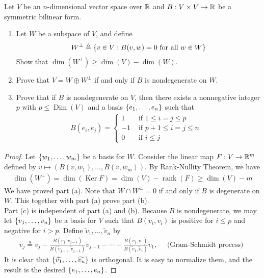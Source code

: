 \documentclass{report}
\begin{document}
\begin{question}{}{}
Let $V$ be an  $n$-dimensional vector space over $\mathbb{R}$ and  $B:V\times V\rightarrow \mathbb{R}$ be a symmetric bilinear form. 
\begin{enumerate}[label=(\alph*)]
  \item Let $W$ be a subspace of $V$, and define 
     \begin{align*}
    W^{\perp}\triangleq \left\{ v \in V: B(v,w)=0\text{ for all }w \in W \right\}
    \end{align*}
    Show that $\operatorname{dim}(W^{\perp})\geq  \operatorname{dim}(V)-\operatorname{dim}(W)$. 
    \item Prove that $V=W \oplus W^{\perp}$ if and only if $B$ is nondegenerate on $W$. 
    \item Prove that if $B$ is nondegenerate on $V$, then there exists a nonnegative integer $p$ with  $p\leq \operatorname{Dim}(V)$ and a basis $\left\{ e_1,\dots ,e_n \right\}$ such that 
      \begin{align*}
      B(e_i,e_j)= \begin{cases}
        1& \text{ if $1\leq i=j\leq p$ }\\
        -1& \text{ if $p+1\leq  i=j \leq n$ }\\
        0& \text{ if $i\leq j$ }
      \end{cases}
      \end{align*}
\end{enumerate}
\end{question}
\begin{proof}
Let $\left\{ w_1,\dots ,w_m \right\}$ be a basis for $W$. Consider the linear map $F:V\rightarrow \mathbb{R}^m$ defined by $v \mapsto  (B(v,w_1),\dots ,B(v,w_m))$. By Rank-Nullity Theorem, we have 
\begin{align*}
\operatorname{dim}(W^{\perp})=\operatorname{dim}(\operatorname{Ker}F)= \operatorname{dim}(V)- \operatorname{rank}(F) \geq  \operatorname{dim}(V)- m
\end{align*}
We have proved part (a). Note that $W\cap W^{\perp}=0$ if and only if $B$ is degenerate on $W$. This together with part  (a) prove part (b). \\

Part (c) is independent of part (a) and (b). Because $B$ is nondegenerate, we may let $\left\{ v_1,\dots ,v_n \right\}$ be a basis for $V$ such that $B(v_i,v_i)$ is positive for $i\leq p$ and negative for $i>p$. Define $\tilde{v}_1,\dots ,\tilde{v}_n  $ by 
\begin{align*}
  \tilde{v}_j\triangleq v_j - \frac{B(v_j,\tilde{v}_{j-1})}{B(\tilde{v} _{j-1},\tilde{v} _{j-1})} \tilde{v}_{j-1} - \cdots - \frac{B(v_j,\tilde{v} _1)}{B(\tilde{v}_1,\tilde{v} _1)} \tilde{v}_1,\quad\text{ (Gram-Schmidt process) }
\end{align*}
It is clear that $\left\{ \widetilde{v_1},\dots ,\widetilde{v_n} \right\}$ is orthogonal. It is easy to normalize them, and the result is the desired $\left\{ e_1,\dots ,e_n \right\}$. 
\end{proof}
\end{document}
